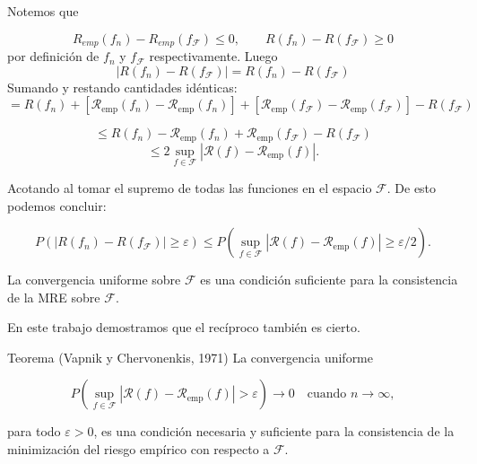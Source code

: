 \documentclass[aspectratio=169, 10pt]{beamer}
\begin{document}
\begin{frame}
Notemos que


\[
 R_{emp}(f_n) - R_{emp}(f_\mathcal{F}) \leq 0, \qquad R(f_n) - R(f_\mathcal{F}) \geq 0
\]
 por definición de \(f_n\) y \(f_\mathcal{F}\) respectivamente.  \pause Luego\\
 \[
 |R(f_n)-R(f_\mathcal{F})| = R(f_n)-R(f_\mathcal{F})
 \]
 \pause
 Sumando y restando cantidades idénticas:
 \[
=R(f_n) + \left[\mathcal{R}_{\text{emp}}(f_n) - \mathcal{R}_{\text{emp}}(f_n)\right] + \left[ \mathcal{R}_{\text{emp}}(f_\mathcal{F}) - \mathcal{R}_{\text{emp}}(f_\mathcal{F})\right] - R(f_\mathcal{F})
\]

 \pause
\[
    \leq R(f_n) - \mathcal{R}_{\text{emp}}(f_n) + \mathcal{R}_{\text{emp}}(f_\mathcal{F}) - R(f_\mathcal{F})
\]
 \pause
\[
    \leq 2 \sup_{f \in \mathcal{F}} |\mathcal{R}(f) - \mathcal{R}_{\text{emp}}(f)|.
\]

Acotando al tomar el supremo de todas las funciones en el espacio \(\mathcal{F}\).
 \pause
De esto podemos concluir:

\[
P\left(|R(f_n) - R(f_\mathcal{F})| \geq \varepsilon \right) \leq P\left(\sup_{f \in \mathcal{F}} |\mathcal{R}(f) - \mathcal{R}_{\text{emp}}(f)| \geq \varepsilon/2\right).
\]
\end{frame}

\begin{frame}


\begin{alertblock}{ }
La convergencia uniforme sobre \(\mathcal{F}\) es una condición suficiente para la consistencia de la MRE sobre \(\mathcal{F}\).
\end{alertblock}

\pause
En este trabajo demostramos que el recíproco también es cierto. \\
\pause
\begin{block}{Teorema (Vapnik y Chervonenkis, 1971)}
  \large
La convergencia uniforme

    \[
        P\left(\sup_{f \in \mathcal{F}} |\mathcal{R}(f) - \mathcal{R}_{\text{emp}}(f)| > \varepsilon \right) \to 0 \quad \text{cuando } n \to \infty,
        \]

        para todo \(\varepsilon > 0\), es una condición necesaria y suficiente para la consistencia de la minimización del
        riesgo empírico con respecto a \(\mathcal{F}\).
\end{block}
\end{frame}
\end{document}

